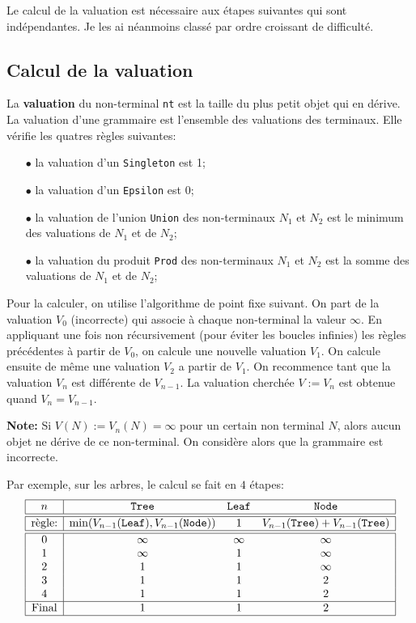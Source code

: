 \documentclass[11pt]{article}
\renewcommand{\emph}[1]{\textbf{#1}}
\begin{document}
Le calcul de la valuation est nécessaire aux étapes suivantes qui sont
indépendantes. Je les ai néanmoins classé par ordre croissant de difficulté.

\subsection{Calcul de la valuation}

La \emph{valuation} du non-terminal \texttt{nt} est la taille du plus petit
objet qui en dérive. La valuation d'une grammaire est l'ensemble des
valuations des terminaux. Elle vérifie les quatres règles suivantes:
\begin{itemize}
\item[$\bullet$] la valuation d'un \texttt{Singleton} est 1;
\item[$\bullet$] la valuation d'un \texttt{Epsilon} est 0;
\item[$\bullet$] la valuation de l'union \texttt{Union} des non-terminaux
  $N_1$ et $N_2$ est le minimum des valuations de $N_1$ et de $N_2$;
\item[$\bullet$] la valuation du produit \texttt{Prod} des non-terminaux $N_1$
  et $N_2$ est la somme des valuations de $N_1$ et de $N_2$;
\end{itemize}

Pour la calculer, on utilise l'algorithme de point fixe suivant. On part de la
valuation $V_0$ (incorrecte) qui associe à chaque non-terminal la valeur
$\infty$. En appliquant une fois non récursivement (pour éviter les boucles
infinies) les règles précédentes à partir de $V_0$, on calcule une nouvelle
valuation $V_1$.  On calcule ensuite de même une valuation $V_2$ a partir de
$V_1$. On recommence tant que la valuation $V_n$ est différente de
$V_{n-1}$. La valuation cherchée $V := V_n$ est obtenue quand $V_n=V_{n-1}$.
\bigskip

\noindent\textbf{Note:} Si $V(N) := V_n(N) = \infty$ pour un certain non terminal
$N$, alors aucun objet ne dérive de ce non-terminal. On considère alors que la
grammaire est incorrecte.  \bigskip

Par exemple, sur les arbres, le calcul se fait en $4$ étapes:
$$\begin{array}{|c|ccc|}
\hline
  n     &  \texttt{Tree}  &  \texttt{Leaf}  &  \texttt{Node} \\
\hline\hline
  \text{règle:} & \min(V_{n-1}(\texttt{Leaf}),V_{n-1}(\texttt{Node}))
               & 1
               & V_{n-1}(\texttt{Tree}) + V_{n-1}(\texttt{Tree}) \\
\hline\hline
  0     &  \infty         &  \infty         &  \infty        \\
  1     &  \infty         &  1              &  \infty        \\
  2     &  1              &  1              &  \infty        \\
  3     &  1              &  1              &  2             \\
  4     &  1              &  1              &  2             \\
\hline
 \text{Final} &  1              &  1              &  2             \\
\hline
\end{array}$$
\end{document}
